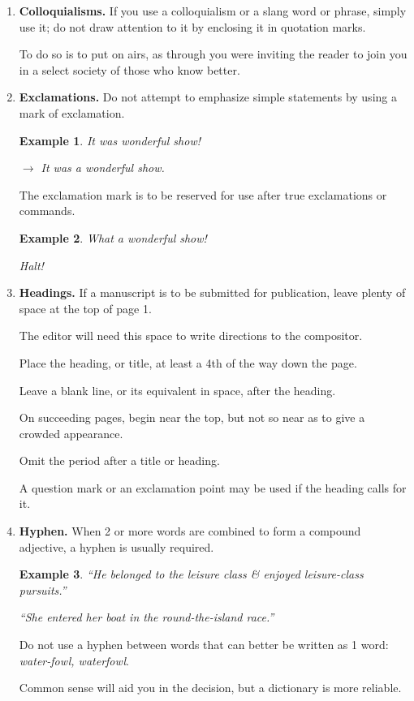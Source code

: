 \documentclass{article}
\newtheorem{example}{Example}
\begin{document}
\begin{enumerate}
	\item {\bf Colloquialisms.} If you use a colloquialism or a slang word or phrase, simply use it; do not draw attention to it by enclosing it in quotation marks.
	
	To do so is to put on airs, as through you were inviting the reader to join you in a select society of those who know better.
	\item {\bf Exclamations.} Do not attempt to emphasize simple statements by using a mark of exclamation.
	\begin{example}
		It was wonderful show!
		
		$\to$ It was a wonderful show.
	\end{example}
	The exclamation mark is to be reserved for use after true exclamations or commands.
	\begin{example}
		What a wonderful show!
		
		Halt!
	\end{example}
	\item {\bf Headings.} If a manuscript is to be submitted for publication, leave plenty of space at the top of page 1.
	
	The editor will need this space to write directions to the compositor.
	
	Place the heading, or title, at least a 4th of the way down the page.
	
	Leave a blank line, or its equivalent in space, after the heading.
	
	On succeeding pages, begin near the top, but not so near as to give a crowded appearance.
	
	Omit the period after a title or heading.
	
	A question mark or an exclamation point may be used if the heading calls for it.
	\item {\bf Hyphen.} When 2 or more words are combined to form a compound adjective, a hyphen is usually required.
	\begin{example}
		``He belonged to the leisure class \& enjoyed leisure-class pursuits.''
		
		``She entered her boat in the round-the-island race.''
	\end{example}
	Do not use a hyphen between words that can better be written as 1 word: {\it water-fowl, waterfowl}.
	
	Common sense will aid you in the decision, but a dictionary is more reliable.
	

\end{enumerate}
\end{document}
